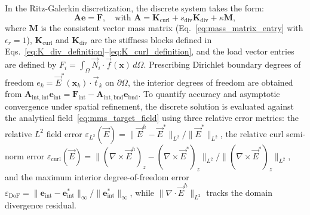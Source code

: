 \documentclass[preprint,12pt]{elsarticle}
\begin{document}
In the Ritz-Galerkin discretization, the discrete system takes the form:
\begin{equation}
    \mathbf{A} \mathbf{e} = \mathbf{F}, \quad \text{with } \mathbf{A} = \mathbf{K}_{\mathrm{curl}} + s_{\mathrm{div}} \mathbf{K}_{\mathrm{div}} + \kappa \mathbf{M},
    \label{eq:mms_discrete_system}
\end{equation}
where $\mathbf{M}$ is the consistent vector mass matrix (Eq.~\eqref{eq:mass_matrix_entry} with $\epsilon_r = 1$), $\mathbf{K}_{\mathrm{curl}}$ and $\mathbf{K}_{\mathrm{div}}$ are the stiffness blocks defined in Eqs.~\eqref{eq:K_div_definition}--\eqref{eq:K_curl_definition}, and the load vector entries are defined by $F_i = \int_\Omega \vec{N}_i \cdot \vec{f}(\mathbf{x})\, d\Omega$. Prescribing Dirichlet boundary degrees of freedom $e_k = \vec{E}^*(\mathbf{x}_k) \cdot \vec{t}_k$ on $\partial\Omega$, the interior degrees of freedom are obtained from $\mathbf{A}_{\mathrm{int}, \mathrm{int}} \mathbf{e}_{\mathrm{int}} = \mathbf{F}_{\mathrm{int}} - \mathbf{A}_{\mathrm{int}, \mathrm{bnd}} \mathbf{e}_{\mathrm{bnd}}$. To quantify accuracy and asymptotic convergence under spatial refinement, the discrete solution is evaluated against the analytical field~\eqref{eq:mms_target_field} using three relative error metrics: the relative $L^2$ field error $\varepsilon_{L^2}(\vec{E}) = \|\vec{E}^h - \vec{E}^*\|_{L^2} / \|\vec{E}^*\|_{L^2}$, the relative curl semi-norm error $\varepsilon_{\mathrm{curl}}(\vec{E}) = \|(\nabla \times \vec{E}^h)_z - (\nabla \times \vec{E}^*)_z\|_{L^2} / \|(\nabla \times \vec{E}^*)_z\|_{L^2}$, and the maximum interior degree-of-freedom error $\varepsilon_{\mathrm{DoF}} = \|\mathbf{e}_{\mathrm{int}} - \mathbf{e}_{\mathrm{int}}^*\|_\infty / \|\mathbf{e}_{\mathrm{int}}^*\|_\infty$, while $\|\nabla \cdot \vec{E}^h\|_{L^2}$ tracks the domain divergence residual.
\end{document}
